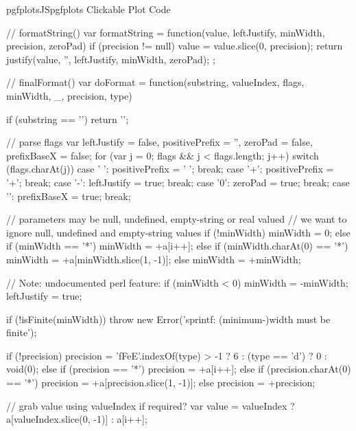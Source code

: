 \begin{insDLJS}[processAnnotatedPlot]{pgfplotsJS}{pgfplots Clickable Plot Code}
{    // formatString()
    var formatString = function(value, leftJustify, minWidth, precision, zeroPad) {
        if (precision != null) {
            value = value.slice(0, precision);
        }
        return justify(value, '', leftJustify, minWidth, zeroPad);
    };

    // finalFormat()
    var doFormat = function(substring, valueIndex, flags, minWidth, _, precision, type) {
        if (substring == '\pgfplotsPERCENT\pgfplotsPERCENT') return '\pgfplotsPERCENT';

        // parse flags
        var leftJustify = false, positivePrefix = '', zeroPad = false, prefixBaseX = false;
        for (var j = 0; flags && j < flags.length; j++) switch (flags.charAt(j)) {
            case ' ': positivePrefix = ' '; break;
            case '+': positivePrefix = '+'; break;
            case '-': leftJustify = true; break;
            case '0': zeroPad = true; break;
            case '\pgfplotsHASH': prefixBaseX = true; break;
        }

        // parameters may be null, undefined, empty-string or real valued
        // we want to ignore null, undefined and empty-string values
        if (!minWidth) {
            minWidth = 0;
        } else if (minWidth == '*') {
            minWidth = +a[i++];
        } else if (minWidth.charAt(0) == '*') {
            minWidth = +a[minWidth.slice(1, -1)];
        } else {
            minWidth = +minWidth;
        }

        // Note: undocumented perl feature:
        if (minWidth < 0) {
            minWidth = -minWidth;
            leftJustify = true;
        }

        if (!isFinite(minWidth)) {
            throw new Error('sprintf: (minimum-)width must be finite');
        }

        if (!precision) {
            precision = 'fFeE'.indexOf(type) > -1 ? 6 : (type == 'd') ? 0 : void(0);
        } else if (precision == '*') {
            precision = +a[i++];
        } else if (precision.charAt(0) == '*') {
            precision = +a[precision.slice(1, -1)];
        } else {
            precision = +precision;
        }

        // grab value using valueIndex if required?
        var value = valueIndex ? a[valueIndex.slice(0, -1)] : a[i++];

}}
\end{insDLJS}
